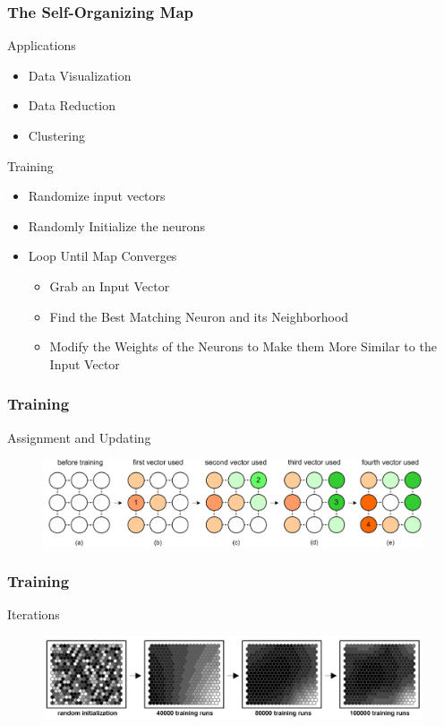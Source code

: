 \documentclass[nototal,handout]{beamer}
\begin{document}
\begin{frame}
	\frametitle{The Self-Organizing Map}
 
\begin{block}{Applications}
 \begin{itemize}
 \item  Data Visualization
 \item  Data Reduction
 \item  Clustering
 \end{itemize}
 \end{block} 
\begin{block}{Training}
 \begin{itemize}
 \item  Randomize input vectors
 \item  Randomly Initialize the neurons
 \item  Loop Until Map Converges
 \begin{itemize}
 \item  Grab an Input Vector
 \item  Find the Best Matching Neuron and its Neighborhood
 \item  Modify the Weights of the Neurons to Make them More Similar to the Input Vector
 \end{itemize}
 \end{itemize}
 \end{block} \end{frame} 

\begin{frame}
	\frametitle{Training}
 
\begin{block}{Assignment and Updating}
  \begin{center}
  \begin{figure}
  \includegraphics[width=0.90\linewidth]{input.png}
  \end{figure}
  \end{center}
 \end{block} \end{frame} 

\begin{frame}
	\frametitle{Training}
 
\begin{block}{Iterations}
  \begin{center}
  \begin{figure}
  \includegraphics[width=0.90\linewidth]{somtrain.png}
  \end{figure}
  \end{center}
 \end{block} \end{frame} 
\end{document}
